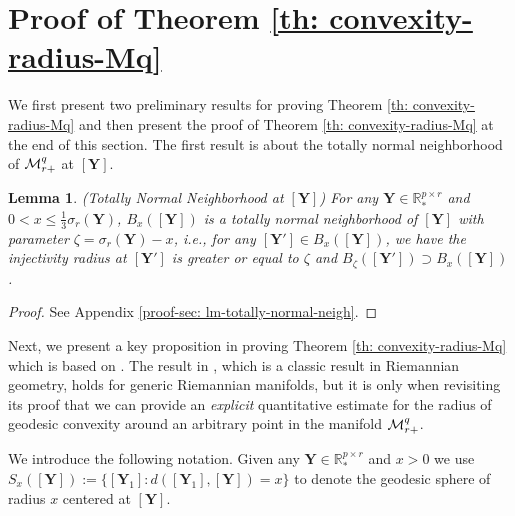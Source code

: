 \documentclass[11pt]{article}
\newtheorem{Lemma}{Lemma}
\newcommand{\bbR}{\mathbb{R}}
\newcommand{\0}{{\mathbf{0}}}
\newcommand{\1}{{\mathbf{1}}}
\newcommand{\Y}{{\mathbf{Y}}}
\newcommand{\cM}{{\cal M}}
\newcommand{\nc}{\normalcolor}
\begin{document}
\section{Proof of Theorem \ref{th: convexity-radius-Mq} } \label{sec: proof-convex-radius}
We first present two preliminary results for proving Theorem \ref{th: convexity-radius-Mq} and then present the proof of Theorem \ref{th: convexity-radius-Mq} at the end of this section. The first result is about the totally normal neighborhood of $\cM_{r+}^q$ at $[\Y]$.

\begin{Lemma}(Totally Normal Neighborhood at $[\Y ]$) \label{lm: totally-normal-neigh}
	For any $\Y \in \bbR^{p \times r}_*$ and $0 < x \leq \frac{1}{3} \sigma_r(\Y)$, $B_x([\Y])$ is a totally normal neighborhood of $[\Y]$ with parameter $\zeta = \sigma_r(\Y) - x$, i.e., for any $[\Y'] \in B_x([\Y])$, we have the injectivity radius at $[\Y']$ is greater or equal to $\zeta$ and $B_\zeta([\Y']) \supset B_{x}([\Y])$.
\end{Lemma}
\begin{proof} See Appendix \ref{proof-sec: lm-totally-normal-neigh}. \end{proof}

Next, we present a key proposition in proving Theorem \ref{th: convexity-radius-Mq} which is based on \cite[Chapter 3.4, Lemma 4.1 and Proposition 4.2]{do1992riemannian}. The result in \cite{do1992riemannian}, which is a classic result in Riemannian geometry, holds for generic Riemannian manifolds, but it is only when revisiting its proof that we can provide an \textit{explicit} quantitative estimate for the radius of geodesic convexity around an arbitrary point in the manifold $\cM_{r+}^q$. \nc  

We introduce the following notation. Given any $\Y \in \bbR^{p \times r}_*$ and $x > 0$ we use $S_x([\Y]) := \{ [\Y_1]: d([\Y_1], [\Y]) = x \}$ to denote the geodesic sphere of radius $x$ centered at $[\Y]$.
\end{document}
